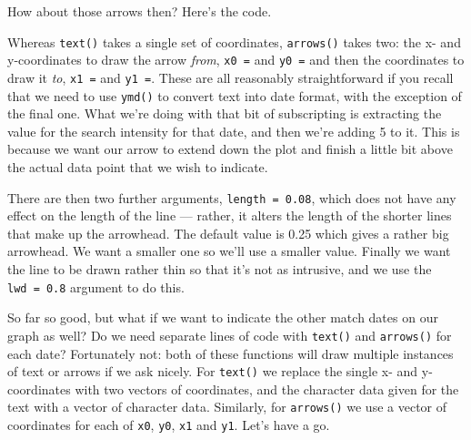 \documentclass[
]{book}
\newenvironment{Shaded}{\begin{snugshade}}{\end{snugshade}}
\newcommand{\CommentTok}[1]{\textcolor[rgb]{0.56,0.35,0.01}{\textit{#1}}}
\newcommand{\DataTypeTok}[1]{\textcolor[rgb]{0.13,0.29,0.53}{#1}}
\newcommand{\DecValTok}[1]{\textcolor[rgb]{0.00,0.00,0.81}{#1}}
\newcommand{\FloatTok}[1]{\textcolor[rgb]{0.00,0.00,0.81}{#1}}
\newcommand{\KeywordTok}[1]{\textcolor[rgb]{0.13,0.29,0.53}{\textbf{#1}}}
\newcommand{\NormalTok}[1]{#1}
\newcommand{\OperatorTok}[1]{\textcolor[rgb]{0.81,0.36,0.00}{\textbf{#1}}}
\newcommand{\StringTok}[1]{\textcolor[rgb]{0.31,0.60,0.02}{#1}}
\begin{document}
How about those arrows then? Here's the code.

\begin{Shaded}
\end{Shaded}

Whereas \texttt{text()} takes a single set of coordinates, \texttt{arrows()} takes two: the x- and y-coordinates to draw the arrow \emph{from}, \texttt{x0\ =} and \texttt{y0\ =} and then the coordinates to draw it \emph{to}, \texttt{x1\ =} and \texttt{y1\ =}. These are all reasonably straightforward if you recall that we need to use \texttt{ymd()} to convert text into date format, with the exception of the final one. What we're doing with that bit of subscripting is extracting the value for the search intensity for that date, and then we're adding 5 to it. This is because we want our arrow to extend down the plot and finish a little bit above the actual data point that we wish to indicate.

There are then two further arguments, \texttt{length\ =\ 0.08}, which does not have any effect on the length of the line --- rather, it alters the length of the shorter lines that make up the arrowhead. The default value is 0.25 which gives a rather big arrowhead. We want a smaller one so we'll use a smaller value. Finally we want the line to be drawn rather thin so that it's not as intrusive, and we use the \texttt{lwd\ =\ 0.8} argument to do this.

So far so good, but what if we want to indicate the other match dates on our graph as well? Do we need separate lines of code with \texttt{text()} and \texttt{arrows()} for each date? Fortunately not: both of these functions will draw multiple instances of text or arrows if we ask nicely. For \texttt{text()} we replace the single x- and y-coordinates with two vectors of coordinates, and the character data given for the text with a vector of character data. Similarly, for \texttt{arrows()} we use a vector of coordinates for each of \texttt{x0}, \texttt{y0}, \texttt{x1} and \texttt{y1}. Let's have a go.
\end{document}
